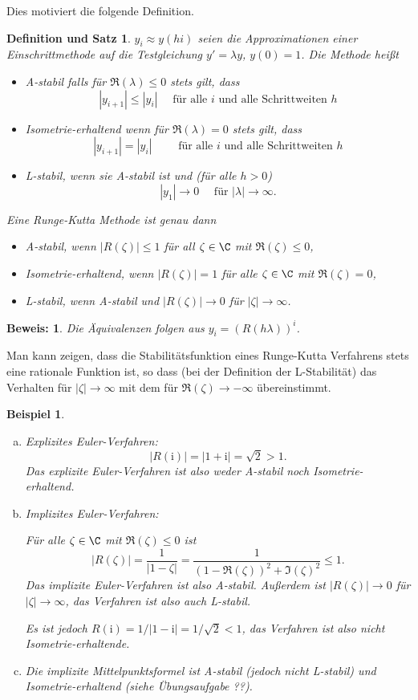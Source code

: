 \documentclass[
]{mycourse}
\theoremstyle{mythm}
\newtheorem{beispiel}[theorem]{Beispiel}
\newtheorem{definitiontheorem}[theorem]{Definition und Satz}
\theoremstyle{break}
\newtheorem*{beweis}{Beweis:}
\renewcommand{\im}{\ensuremath{\mathrm{i}}} 			      	%
\begin{document}
Dies motiviert die folgende Definition.
\begin{definitiontheorem}\label{defthm:stability}
$y_i\approx y(hi)$ seien die Approximationen einer Einschrittmethode auf die Testgleichung $y'=\lambda y$, $y(0)=1$.
Die Methode heißt
\begin{itemize}
\item \emph{A-stabil} falls für $\Re(\lambda)\leq 0$ stets gilt, dass
\[
|y_{i+1}|\leq |y_i| \quad \mbox{ für alle $i$ und alle Schrittweiten $h$}
\]
\item \emph{Isometrie-erhaltend} wenn für $\Re(\lambda)=0$ stets gilt, dass
\[
|y_{i+1}|=|y_i|\quad \quad \mbox{ für alle $i$ und alle Schrittweiten $h$}
\]
\item \emph{L-stabil}, wenn sie A-stabil ist und (für alle $h>0$) 
\[
|y_1|\to 0 \quad \mbox{ für } |\lambda|\to \infty.
\]
\end{itemize}
Eine Runge-Kutta Methode ist genau dann
\begin{itemize}
\item A-stabil, wenn $|R(\zeta)|\leq 1$ für all $\zeta\in \C$ mit $\Re(\zeta)\leq 0$,
\item Isometrie-erhaltend, wenn $|R(\zeta)|=1$ für alle $\zeta\in \C$ mit $\Re(\zeta)= 0$,
\item L-stabil, wenn A-stabil und $|R(\zeta)|\to 0$ für $|\zeta|\to \infty$.
\end{itemize}
\end{definitiontheorem}
\begin{beweis}
Die Äquivalenzen folgen aus $y_i=(R(h\lambda))^i$.
\end{beweis}

Man kann zeigen, dass die Stabilitätsfunktion eines Runge-Kutta Verfahrens stets eine rationale Funktion ist, so
dass (bei der Definition der L-Stabilität) das Verhalten für $|\zeta|\to \infty$ mit dem für $\Re(\zeta)\to -\infty$ übereinstimmt.

\begin{beispiel}
\begin{enumerate}[(a)]
\item Explizites Euler-Verfahren:
\[
|R(\im)|=|1+\im|=\sqrt{2}>1.
\]
Das explizite Euler-Verfahren ist also weder A-stabil noch Isometrie-erhaltend.
%
\item Implizites Euler-Verfahren:

Für alle $\zeta\in \C$ mit $\Re(\zeta)\leq 0$ ist
\[
|R(\zeta)|=\frac{1}{|1-\zeta|}=\frac{1}{(1-\Re(\zeta))^2+\Im(\zeta)^2}\leq 1.
\]
Das implizite Euler-Verfahren ist also A-stabil. Außerdem ist $|R(\zeta)|\to 0$ für $|\zeta|\to \infty$, das Verfahren ist also auch L-stabil.

Es ist jedoch $R(\im)=1/|1-\im|=1/\sqrt{2}< 1$, das Verfahren ist also nicht Isometrie-erhaltende.
\item Die implizite Mittelpunktsformel ist A-stabil (jedoch nicht L-stabil) und Isometrie-erhaltend (siehe Übungsaufgabe ??).
\end{enumerate}
\end{beispiel}
\end{document}

